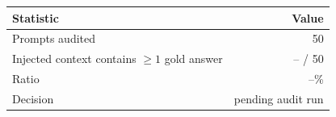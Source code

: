 \begin{tabular}{lr}
\toprule
Statistic & Value \\
\midrule
Prompts audited & 50 \\
Injected context contains $\geq 1$ gold answer & -- / 50 \\
Ratio & --\% \\
Decision & pending audit run \\
\bottomrule
\end{tabular}
